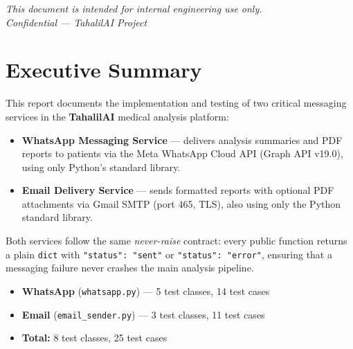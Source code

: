 \documentclass[12pt, a4paper]{article}
\begin{document}
\begin{titlepage}
  \vfill
  {\small\color{gray}
    \textit{This document is intended for internal engineering use only.}\\
    \textit{Confidential — TahalilAI Project}}
\end{titlepage}

\tableofcontents
\newpage

\section{Executive Summary}

This report documents the implementation and testing of two critical
messaging services in the \textbf{TahalilAI} medical analysis platform:

\begin{itemize}[leftmargin=1.5em]
  \item \textbf{WhatsApp Messaging Service} — delivers analysis summaries
        and PDF reports to patients via the Meta WhatsApp Cloud API (Graph
        API v19.0), using only Python's standard library.
  \item \textbf{Email Delivery Service} — sends formatted reports with
        optional PDF attachments via Gmail SMTP (port 465, TLS), also
        using only the Python standard library.
\end{itemize}

Both services follow the same \emph{never-raise} contract: every public
function returns a plain \texttt{dict} with \texttt{"status": "sent"} or
\texttt{"status": "error"}, ensuring that a messaging failure never crashes
the main analysis pipeline.

\begin{successbox}
  \begin{itemize}[leftmargin=1em, nosep]
    \item \textbf{WhatsApp} (\texttt{whatsapp.py}) — 5 test classes, 14 test cases
    \item \textbf{Email} (\texttt{email\_sender.py}) — 3 test classes, 11 test cases
    \item \textbf{Total:} 8 test classes, 25 test cases
  \end{itemize}
\end{successbox}

\end{document}
